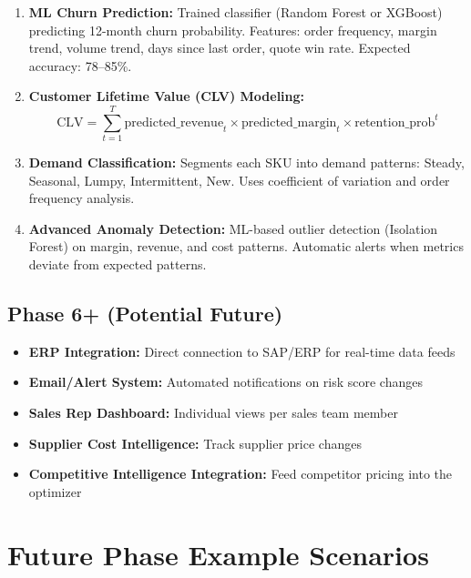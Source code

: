 \documentclass[11pt,a4paper]{article}
\begin{document}
\begin{enumerate}
  \item \textbf{ML Churn Prediction:} Trained classifier (Random Forest or XGBoost) predicting 12-month churn probability. Features: order frequency, margin trend, volume trend, days since last order, quote win rate. Expected accuracy: 78--85\%.

  \item \textbf{Customer Lifetime Value (CLV) Modeling:}
  \[
    \text{CLV} = \sum_{t=1}^{T} \text{predicted\_revenue}_t \times \text{predicted\_margin}_t \times \text{retention\_prob}^t
  \]

  \item \textbf{Demand Classification:} Segments each SKU into demand patterns: Steady, Seasonal, Lumpy, Intermittent, New. Uses coefficient of variation and order frequency analysis.

  \item \textbf{Advanced Anomaly Detection:} ML-based outlier detection (Isolation Forest) on margin, revenue, and cost patterns. Automatic alerts when metrics deviate from expected patterns.
\end{enumerate}

\subsection{Phase 6+ (Potential Future)}

\begin{itemize}[nosep]
  \item \textbf{ERP Integration:} Direct connection to SAP/ERP for real-time data feeds
  \item \textbf{Email/Alert System:} Automated notifications on risk score changes
  \item \textbf{Sales Rep Dashboard:} Individual views per sales team member
  \item \textbf{Supplier Cost Intelligence:} Track supplier price changes
  \item \textbf{Competitive Intelligence Integration:} Feed competitor pricing into the optimizer
\end{itemize}

\section{Future Phase Example Scenarios}
\end{document}
